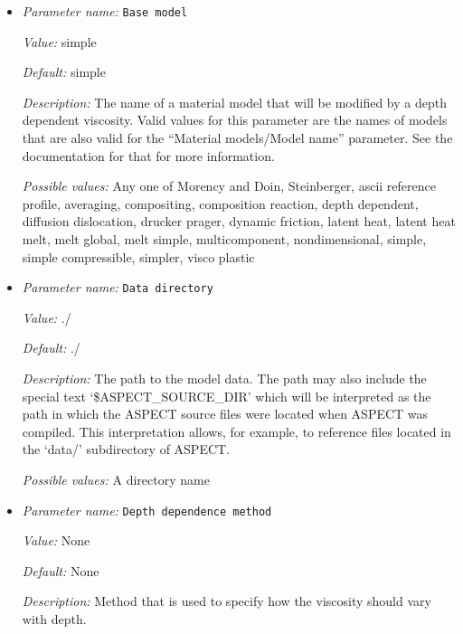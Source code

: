 \begin{itemize}
\item {\it Parameter name:} {\tt Base model}
\label{parameters:Material model/Depth dependent model/Base model}


{\it Value:} simple


{\it Default:} simple


{\it Description:} The name of a material model that will be modified by a depth dependent viscosity. Valid values for this parameter are the names of models that are also valid for the ``Material models/Model name'' parameter. See the documentation for that for more information.


{\it Possible values:} Any one of Morency and Doin, Steinberger, ascii reference profile, averaging, compositing, composition reaction, depth dependent, diffusion dislocation, drucker prager, dynamic friction, latent heat, latent heat melt, melt global, melt simple, multicomponent, nondimensional, simple, simple compressible, simpler, visco plastic
\item {\it Parameter name:} {\tt Data directory}
\label{parameters:Material model/Depth dependent model/Data directory}


{\it Value:} ./


{\it Default:} ./


{\it Description:} The path to the model data. The path may also include the special text `\$ASPECT\_SOURCE\_DIR' which will be interpreted as the path in which the ASPECT source files were located when ASPECT was compiled. This interpretation allows, for example, to reference files located in the `data/' subdirectory of ASPECT. 


{\it Possible values:} A directory name
\item {\it Parameter name:} {\tt Depth dependence method}
\label{parameters:Material model/Depth dependent model/Depth dependence method}


{\it Value:} None


{\it Default:} None


{\it Description:} Method that is used to specify how the viscosity should vary with depth. 



\end{itemize}
